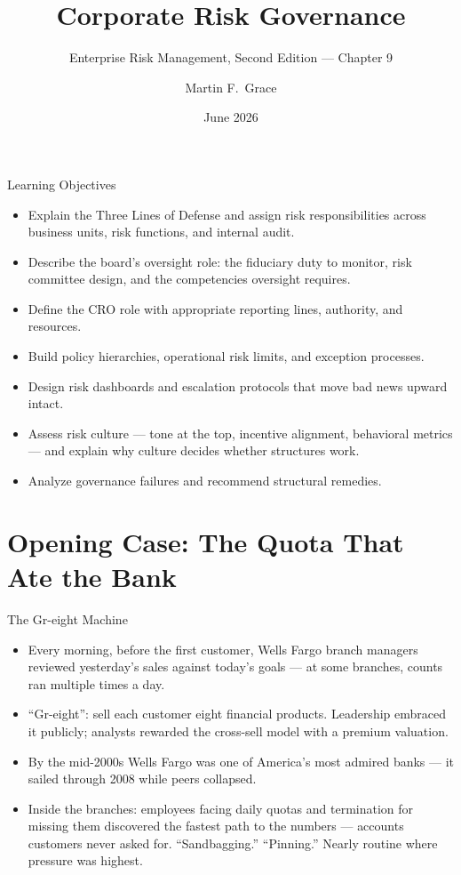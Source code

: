 \documentclass[11pt, aspectratio=169]{beamer}
\title[ERM Ch.\,9]{Corporate Risk Governance}
\subtitle{Enterprise Risk Management, Second Edition --- Chapter 9}
\author{Martin F.\ Grace}
\institute{University of Iowa\\[2pt] Tippie College of Business\\[2pt] Vaughan Institute of Risk Management}
\date{June 2026}
\begin{document}
\begin{frame}[plain]
\titlepage
\end{frame}

\begin{frame}{Learning Objectives}
\begin{itemize}
  \item Explain the \alert{Three Lines of Defense} and assign risk responsibilities across business units, risk functions, and internal audit.
  \item Describe the board's oversight role: the fiduciary \alert{duty to monitor}, risk committee design, and the competencies oversight requires.
  \item Define the \alert{CRO} role with appropriate reporting lines, authority, and resources.
  \item Build policy hierarchies, operational risk limits, and exception processes.
  \item Design risk dashboards and escalation protocols that move bad news upward intact.
  \item Assess \alert{risk culture} --- tone at the top, incentive alignment, behavioral metrics --- and explain why culture decides whether structures work.
  \item Analyze governance failures and recommend structural remedies.
\end{itemize}
\end{frame}

\section{Opening Case: The Quota That Ate the Bank}

\begin{frame}{The Gr-eight Machine}
\begin{itemize}
  \item Every morning, before the first customer, Wells Fargo branch managers reviewed yesterday's sales against today's goals --- at some branches, counts ran multiple times a day.
  \item ``Gr-eight'': sell each customer \alert{eight financial products}. Leadership embraced it publicly; analysts rewarded the cross-sell model with a premium valuation.
  \item By the mid-2000s Wells Fargo was one of America's most admired banks --- it sailed through 2008 while peers collapsed.
  \item Inside the branches: employees facing daily quotas and termination for missing them discovered the fastest path to the numbers --- \alert{accounts customers never asked for}. ``Sandbagging.'' ``Pinning.'' Nearly routine where pressure was highest.
\end{itemize}
\end{frame}
\end{document}
